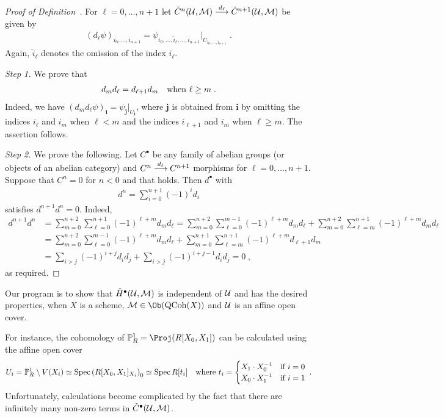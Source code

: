 \documentclass[a4paper,parskip=half,numbers=enddot, DIV=12]{scrreprt}
\begin{document}
\begin{proof}[Proof of Definition~]
	For $\ell=0,\ldots,n+1$ let $\check{C}^n(\Uu,\Mm)\morphism[d_\ell]\check{C}^{n+1}(\Uu,\Mm)$ be given by
	\begin{align*}
		(d_\ell\psi)_{i_0,\ldots,i_{n+1}}=\psi_{i_0,\ldots,\hat{i}_\ell,\ldots,i_{n+1}}|_{U_{i_0,\ldots,i_{n+1}}}\;.
	\end{align*}
	Again, $\hat{i}_\ell$ denotes the omission of the index $i_\ell$.
	
	\emph{Step 1.} We prove that
	\begin{align}\lbl{eq:simplicialStuff}
		d_md_\ell=d_{\ell+1}d_m\quad\text{when }\ell\geq m\;.
	\end{align}
	Indeed, we have $(d_md_\ell\psi)_{\boldsymbol{i}}=\psi_{\boldsymbol{j}}|_{U_{\boldsymbol{i}}}$, where $\boldsymbol{j}$ is obtained from $\boldsymbol{i}$ by omitting the indices $i_\ell$ and $i_m$ when $\ell<m$ and the indices $i_{\ell+1}$ and $i_m$ when $\ell\geq m$. The assertion follows.
	
	\emph{Step 2.} We prove the following. Let $C^\bullet $ be any family of abelian groups (or objects of an abelian category) and $C^n\morphism[d_\ell]C^{n+1}$ morphisms for $\ell=0,\ldots,n+1$. Suppose that $C^n=0$ for $n<0$ and that  holds. Then $d^\bullet$ with
	\begin{align*}
		d^n=\sum_{i=0}^{n+1}(-1)^id_i
	\end{align*}
	satisfies $d^{n+1}d^n=0$. Indeed,
	\begin{align*}
		d^{n+1}d^n&=\sum_{m=0}^{n+2}\sum_{\ell=0}^{n+1}(-1)^{\ell+m}d_md_\ell=\sum_{m=0}^{n+2}\sum_{\ell=0}^{m-1}(-1)^{\ell+m}d_md_\ell+\sum_{m=0}^{n+2}\sum_{\ell=m}^{n+1}(-1)^{\ell+m}d_md_\ell\\
		&=\sum_{m=0}^{n+2}\sum_{\ell=0}^{m-1}(-1)^{\ell+m}d_md_\ell+\sum_{m=0}^{n+1}\sum_{\ell=m}^{n+1}(-1)^{\ell+m}d_{\ell+1}d_m\\
		&=\sum_{i>j}(-1)^{i+j}d_id_j+\sum_{i>j}(-1)^{i+j-1}d_id_j=0\;,
	\end{align*}
	as required.
\end{proof}
\begin{rem*}
	Our program is to show that $\check{H}^\bullet (\mathcal{U},\mathcal{M})$ is independent of $\mathcal{U}$ and has the desired properties, when $X$ is a scheme, $\Mm\in\Ob(\cat{QCoh}(X))$ and $\mathcal{U}$ is an affine open cover.
\end{rem*}
\begin{rem*}
	For instance, the cohomology of $\IP_R^1=\Proj(R[X_0,X_1])$ can be calculated using the affine open cover 
	\begin{align*}
		U_i=\mathbb{P}_R^1\setminus V(X_i)\simeq \operatorname{Spec} \left(R[X_0,X_1]_{X_i}\right)_0\simeq \operatorname{Spec} R[t_i]\quad\text{where }t_i=
		\begin{cases}
			X_1\cdot X_0^{-1} & \text{if }i=0\\
			X_0\cdot X_1^{-1} & \text{if }i=1
		\end{cases}\;.
	\end{align*}
	Unfortunately, calculations become complicated by the fact that there are infinitely many non-zero terms in $\check{C}^\bullet (\mathcal{U},\mathcal{M})$.
\end{rem*}
\end{document}
